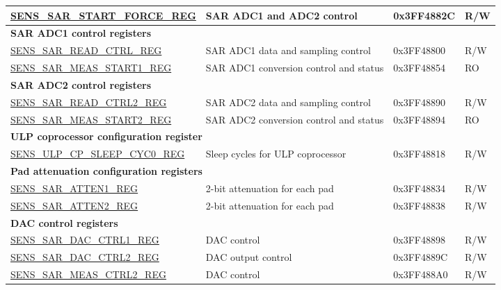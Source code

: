 \begin{longtable}{ | p{5.5cm} | p{7cm} | p{2cm} | p{1cm} | }
\hyperref[regdesc:SENSSARSTARTFORCEREG]{SENS\_SAR\_START\_FORCE\_REG} & SAR ADC1 and ADC2 control & 0x3FF4882C & R/W \\ \hline
\multicolumn{4}{|l|}{\textbf{SAR ADC1 control registers}} \\ \hline
\hyperref[regdesc:SENSSARREADCTRLREG]{SENS\_SAR\_READ\_CTRL\_REG} & SAR ADC1 data and sampling control & 0x3FF48800 & R/W \\ \hline
\hyperref[regdesc:SENSSARMEASSTART1REG]{SENS\_SAR\_MEAS\_START1\_REG} & SAR ADC1 conversion control and status & 0x3FF48854 & RO \\ \hline
\multicolumn{4}{|l|}{\textbf{SAR ADC2 control registers}} \\ \hline
\hyperref[regdesc:SENSSARREADCTRL2REG]{SENS\_SAR\_READ\_CTRL2\_REG} & SAR ADC2 data and sampling control & 0x3FF48890 & R/W \\ \hline
\hyperref[regdesc:SENSSARMEASSTART2REG]{SENS\_SAR\_MEAS\_START2\_REG} & SAR ADC2 conversion control and status & 0x3FF48894 & RO \\ \hline
\multicolumn{4}{|l|}{\textbf{ULP coprocessor configuration register}} \\ \hline
\hyperref[regdesc:SENSULPCPSLEEPCYC0REG]{SENS\_ULP\_CP\_SLEEP\_CYC0\_REG} & Sleep cycles for ULP coprocessor & 0x3FF48818 & R/W \\ \hline
\multicolumn{4}{|l|}{\textbf{Pad attenuation configuration registers}} \\ \hline
\hyperref[regdesc:SENSSARATTEN1REG]{SENS\_SAR\_ATTEN1\_REG} & 2-bit attenuation for each pad & 0x3FF48834 & R/W \\ \hline
\hyperref[regdesc:SENSSARATTEN2REG]{SENS\_SAR\_ATTEN2\_REG} & 2-bit attenuation for each pad & 0x3FF48838 & R/W \\ \hline
\multicolumn{4}{|l|}{\textbf{DAC control registers}} \\ \hline
\hyperref[regdesc:SENSSARDACCTRL1REG]{SENS\_SAR\_DAC\_CTRL1\_REG} & DAC control & 0x3FF48898 & R/W \\ \hline
\hyperref[regdesc:SENSSARDACCTRL2REG]{SENS\_SAR\_DAC\_CTRL2\_REG} & DAC output control & 0x3FF4889C & R/W \\ \hline
\hyperref[regdesc:SENSSARMEASCTRL2REG]{SENS\_SAR\_MEAS\_CTRL2\_REG} & DAC control & 0x3FF488A0 & R/W \\ \hline
\end{longtable}

